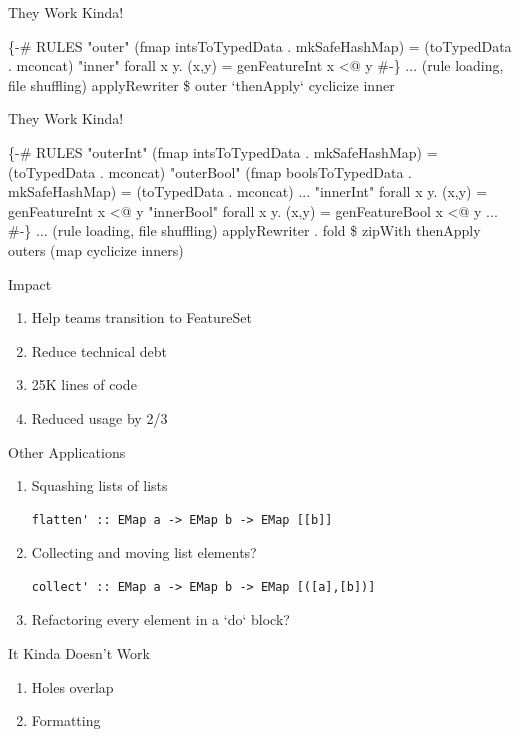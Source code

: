 \documentclass{beamer}
\begin{document}
  \begin{frame}[fragile]{They Work Kinda!}
\begin{semiverbatim}
\{-# RULES
  "outer" (fmap intsToTypedData . mkSafeHashMap) 
    = (toTypedData . mconcat)
  "inner" forall x y. (x,y) = genFeatureInt x <@ y
#-\}
... (rule loading, file shuffling)
applyRewriter \$ outer `thenApply` cyclicize inner
\end{semiverbatim}
  \end{frame}

  \begin{frame}[fragile]{They Work Kinda!}
\begin{semiverbatim}
\{-# RULES
  "outerInt" (fmap intsToTypedData . mkSafeHashMap) 
    = (toTypedData . mconcat)
  "outerBool" (fmap boolsToTypedData . mkSafeHashMap) 
    = (toTypedData . mconcat)
  ...
  "innerInt" forall x y. (x,y) = genFeatureInt x <@ y
  "innerBool" forall x y. (x,y) = genFeatureBool x <@ y
  ...
#-\}
... (rule loading, file shuffling)
applyRewriter . fold 
  \$ zipWith thenApply outers (map cyclicize inners)
\end{semiverbatim}
  \end{frame}

  \begin{frame}[fragile]{Impact}
    \begin{enumerate}
      \item Help teams transition to FeatureSet
      \item Reduce technical debt
      \item 25K lines of code
      \item Reduced usage by 2/3
    \end{enumerate}
  \end{frame}

  \begin{frame}[fragile]{Other Applications}
    \begin{enumerate}
      \item Squashing lists of lists
        \begin{verbatim}flatten' :: EMap a -> EMap b -> EMap [[b]] \end{verbatim}
      \item Collecting and moving list elements?
        \begin{verbatim}collect' :: EMap a -> EMap b -> EMap [([a],[b])] \end{verbatim}
      \item Refactoring every element in a `do` block?
    \end{enumerate}
  \end{frame}

  \begin{frame}[fragile]{It Kinda Doesn't Work}
    \begin{enumerate}
      \item Holes overlap
      \item Formatting
    \end{enumerate}
  \end{frame}
\end{document}
